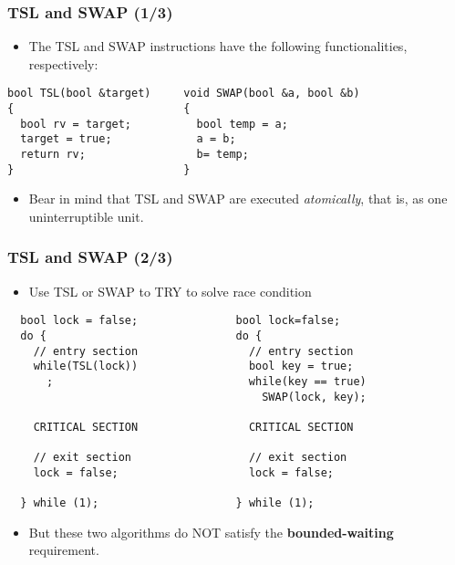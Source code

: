 \documentclass[CJKutf8,dvipsnames,table]{beamer}
\begin{document}
\begin{CJK*}{UTF8}{song}
  \begin{frame}[fragile]
  \frametitle{TSL and SWAP (1/3)} \pause
  \begin{itemize}
  \item{The TSL and SWAP instructions have the following functionalities, respectively:} \pause
  \end{itemize}

\begin{lstlisting}
bool TSL(bool &target)     void SWAP(bool &a, bool &b)
{                          {
  bool rv = target;          bool temp = a;
  target = true;             a = b;
  return rv;                 b= temp;
}                          }
\end{lstlisting}

  \pause

  \begin{itemize}
  \item{Bear in mind that TSL and SWAP are executed \emph{atomically}, that is, as one uninterruptible unit.}
  \end{itemize}
\end{frame}

  \begin{frame}[fragile]
  \frametitle{TSL and SWAP (2/3)} \pause
  \begin{itemize}
  \item{Use TSL or SWAP to TRY to solve race condition} \pause
  \end{itemize}

\begin{lstlisting}
  bool lock = false;               bool lock=false;
  do {                             do {
    // entry section                 // entry section
    while(TSL(lock))                 bool key = true;
      ;                              while(key == true)
                                       SWAP(lock, key);

    CRITICAL SECTION                 CRITICAL SECTION

    // exit section                  // exit section
    lock = false;                    lock = false;

  } while (1);                     } while (1);
\end{lstlisting}

  \pause

  \begin{itemize}
  \item{But these two algorithms do NOT satisfy the \textbf{bounded-waiting} requirement.}
  \end{itemize}
\end{frame}


\end{CJK*}
\end{document}

